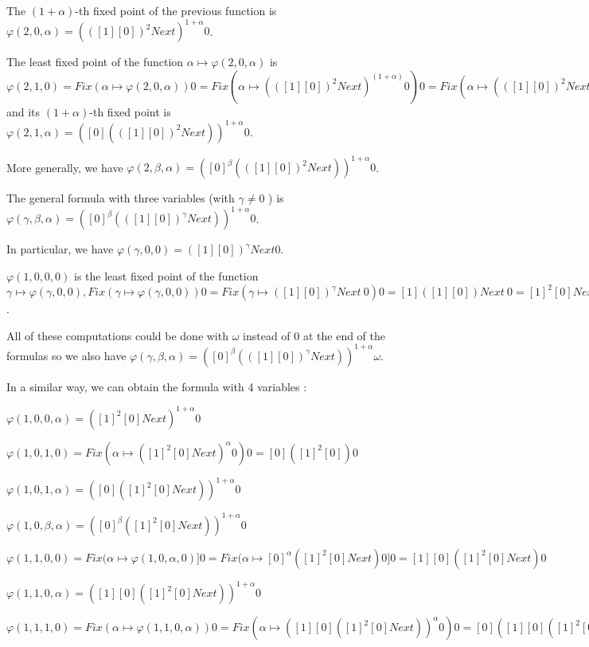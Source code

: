 \documentclass[10pt]{article}
\begin{document}
The \( (1+\alpha) \)-th fixed point of the previous function is \( \varphi(2,0,\alpha) = (([1] [0])^2 Next)^{1+\alpha} 0 \).

The least fixed point of the function \( \alpha \mapsto \varphi(2,0,\alpha) \) is \( \varphi(2,1,0) = Fix (\alpha \mapsto \varphi(2,0,\alpha)) 0 = Fix (\alpha \mapsto (([1] [0])^2 Next)^(1+\alpha) 0) 0 = Fix (\alpha \mapsto (([1] [0])^2 Next)^\alpha 0) = [0] (([1] [0])^2 Next) 0 \) and its \( (1+\alpha) \)-th fixed point is \( \varphi(2,1,\alpha) = ([0] (([1] [0])^2 Next))^{1+\alpha} 0 \).

More generally, we have \( \varphi(2,\beta,\alpha) = ([0]^\beta (([1] [0])^2 Next))^{1+\alpha} 0 \).

\bigskip

The general formula with three variables (with \( \gamma \neq 0 \) ) is \( \varphi(\gamma,\beta,\alpha) = ([0]^\beta (([1] [0])^\gamma Next))^{1+\alpha} 0 \).

In particular, we have \( \varphi(\gamma,0,0) = ([1] [0])^\gamma Next 0 \).

\bigskip

\( \varphi(1,0,0,0) \) is the least fixed point of the function \( \gamma \mapsto \varphi(\gamma,0,0), Fix (\gamma \mapsto \varphi(\gamma,0,0)) 0 = Fix (\gamma \mapsto ([1] [0])^\gamma Next\ 0) 0 = [1] ([1] [0]) Next\ 0 = [1]^2 [0] Next\ 0 \).

All of these computations could be done with \( \omega \) instead of 0 at the end of the formulas so we also have \( \varphi(\gamma,\beta,\alpha) = ([0]^\beta (([1] [0])^\gamma Next))^{1+\alpha} \omega \).

In a similar way, we can obtain the formula with 4 variables :

\( \varphi(1,0,0,\alpha) = ([1]^2 [0] Next)^{1+\alpha} 0 \)

\( \varphi(1,0,1,0) = Fix (\alpha \mapsto ([1]^2 [0] Next)^\alpha 0) 0 = [0] ([1]^2 [0]) 0 \)

\( \varphi (1,0,1,\alpha) = ([0] ([1]^2 [0] Next))^{1+\alpha} 0 \)

\( \varphi(1,0,\beta,\alpha) = ([0]^\beta ([1]^2 [0] Next))^{1+\alpha} 0 \)

\( \varphi(1,1,0,0) = Fix (\alpha \mapsto \varphi(1,0,\alpha,0)] 0 = Fix (\alpha \mapsto [0]^\alpha ([1]^2 [0] Next) 0] 0 = [1] [0] ([1]^2 [0] Next) 0 \)

\( \varphi(1,1,0,\alpha) = ([1] [0] ([1]^2 [0] Next))^{1+\alpha} 0 \)

\( \varphi(1,1,1,0) = Fix (\alpha \mapsto \varphi(1,1,0,\alpha)) 0 = Fix (\alpha \mapsto ([1] [0] ([1]^2 [0] Next))^\alpha 0) 0 = [0] ([1] [0] ([1]^2 [0] Next)) 0 \)
\end{document}
